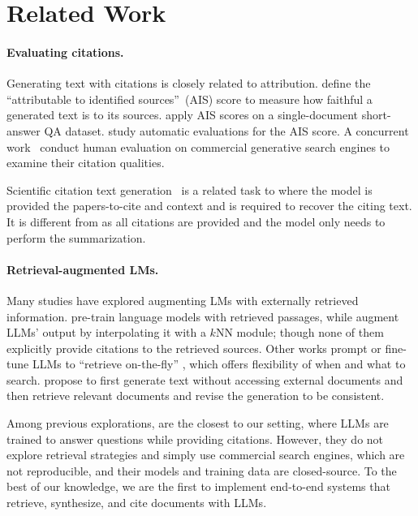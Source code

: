 \section{Related Work}
\label{sec:related_work}
\vspace{-5pt}

\paragraph{Evaluating citations.}
Generating text with citations is closely related to attribution.
\citet{rashkin2021measuring} define the ``attributable to identified sources''~(AIS) score to measure how faithful a generated text is to its sources.
\citet{bohnet2022attributed} apply AIS scores on a single-document short-answer QA dataset.
\citet{honovich-etal-2022-true-evaluating,yue2023automatic} study  automatic evaluations for the AIS score.
A concurrent work~\citep{liu2023evaluating} 
conduct human evaluation on commercial generative search engines  to
examine their citation qualities.

Scientific citation text generation~\citep{funkquist2022citebench} is a related task to \citeeval{} where the model is provided the  papers-to-cite and  context and is required to recover the citing text. 
It is different from \citeeval{} 
as all citations are provided
and the model only needs to perform the summarization.







\paragraph{Retrieval-augmented LMs.}
Many studies have explored augmenting LMs with 
externally retrieved information.
\citet{guu2020realm,borgeaud2022retro,izacard2022atlas}
pre-train language models with retrieved passages, 
while \citet{Khandelwal2020Generalization,zhong-etal-2022-training} augment
LLMs' output by interpolating it with a $k$NN module;
though none of them explicitly provide citations to the retrieved sources.
Other works prompt or fine-tune LLMs to 
``retrieve on-the-fly'' \citep{parisi2022talm,schick2023toolformer,shuster-etal-2022-language,jiang2023active,yao2023react,press2022measuring},
which offers flexibility of when and what to search.
\citet{gao2022rarr,he2022rethinking} propose to first generate text without accessing external documents and then
retrieve relevant documents and revise the generation to be consistent. %

Among previous explorations, \citet{nakano2021webgpt,menick2022teaching} 
are the closest to our setting, where
LLMs are trained to answer questions while providing citations. 
However, they do not explore retrieval strategies and simply use commercial search engines, which are not reproducible, and their models and training data are closed-source.
To the best of our knowledge, 
we are the first to implement end-to-end systems that retrieve, synthesize, and cite documents with LLMs.



